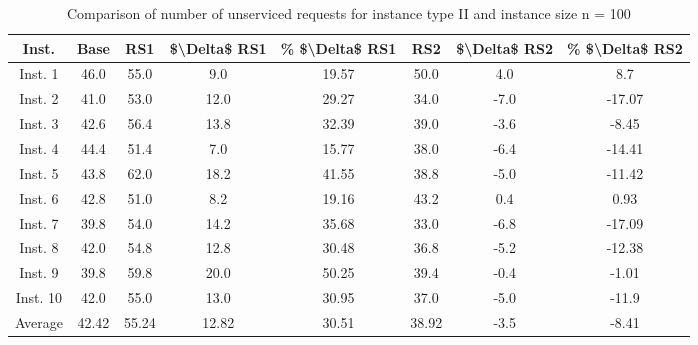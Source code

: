 \begin{table}[H]
\centering
\begin{tabular}{cccccccc}
  \hline
  \textbf{Inst.} & \textbf{Base} & \textbf{RS1} & \textbf{\$\textbackslash{}Delta\$  RS1} & \textbf{\% \$\textbackslash{}Delta\$  RS1} & \textbf{RS2} & \textbf{\$\textbackslash{}Delta\$  RS2} & \textbf{\% \$\textbackslash{}Delta\$  RS2} \\\hline
  Inst. 1 & 46.0 & 55.0 & 9.0 & 19.57 & 50.0 & 4.0 & 8.7 \\
  Inst. 2 & 41.0 & 53.0 & 12.0 & 29.27 & 34.0 & -7.0 & -17.07 \\
  Inst. 3 & 42.6 & 56.4 & 13.8 & 32.39 & 39.0 & -3.6 & -8.45 \\
  Inst. 4 & 44.4 & 51.4 & 7.0 & 15.77 & 38.0 & -6.4 & -14.41 \\
  Inst. 5 & 43.8 & 62.0 & 18.2 & 41.55 & 38.8 & -5.0 & -11.42 \\
  Inst. 6 & 42.8 & 51.0 & 8.2 & 19.16 & 43.2 & 0.4 & 0.93 \\
  Inst. 7 & 39.8 & 54.0 & 14.2 & 35.68 & 33.0 & -6.8 & -17.09 \\
  Inst. 8 & 42.0 & 54.8 & 12.8 & 30.48 & 36.8 & -5.2 & -12.38 \\
  Inst. 9 & 39.8 & 59.8 & 20.0 & 50.25 & 39.4 & -0.4 & -1.01 \\
  Inst. 10 & 42.0 & 55.0 & 13.0 & 30.95 & 37.0 & -5.0 & -11.9 \\
  Average & 42.42 & 55.24 & 12.82 & 30.51 & 38.92 & -3.5 & -8.41 \\\hline
\end{tabular}
\caption{Comparison of number of unserviced requests for instance type II and instance size n = 100}
\label{tab:wait:resrelocation-nTaxi-comparison_II_100}
\end{table}

